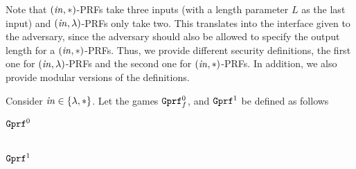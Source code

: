 Note that $(\mathit{in},*)$-PRFs take three inputs (with a length parameter $L$ as the last input) and $(\mathit{in},\lambda)$-PRFs only
take two. This translates into the interface given to the adversary, since the adversary should also be allowed to
specify the output length for a $(\mathit{in},*)$-PRFs. Thus, we provide different security definitions, the first one
for $(\mathit{in},\lambda)$-PRFs and the second one for $(\mathit{in},*)$-PRFs. In addition, we also provide modular versions
of the definitions.


\begin{security}
Consider $\mathit{in}\in\{\lambda,*\}$. Let the games $\text{\texttt{Gprf}}_f^0$, and $\text{\texttt{Gprf}}^1$ be defined as follows
\begin{codebox}
\begin{center}
    \begin{pchstack}
          \begin{pcvstack}
            \underline{\underline{$\text{\texttt{Gprf}}^0$}}\\
                \\
										\pcvspace
										\pcvspace
    \end{pcvstack}
            \pchspace
    \begin{pcvstack}
            \underline{\underline{$\text{\texttt{Gprf}}^1$}}\\
                \\
										\pcvspace
\end{pcvstack}
\end{pchstack}
\end{center}
\end{codebox}
\end{security}
